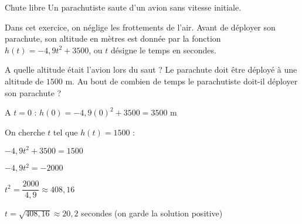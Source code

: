 \def\rdifficulty{2}
\begin{EXO}{Chute libre}{}
Un parachutiste saute d'un avion sans vitesse initiale.

Dans cet exercice, on néglige les frottements de l'air.
Avant de déployer son parachute, son altitude en mètres est donnée par la fonction $h(t)=-4,9t^2+3500$, ou $t$ désigne le temps en secondes.
\begin{tcbenumerate}[1]
\tcbitem {} A quelle altitude était l'avion lors du saut ?
\tcbitem {} Le parachute doit être déployé à une altitude de $1500$ m. Au bout de combien de temps le parachutiste doit-il déployer son parachute ?
\end{tcbenumerate}

\exocorrection

\begin{tcbenumerate}[1]
\tcbitem A $t=0$ : $h(0) = -4,9(0)^2 + 3500 = 3500$ m

\tcbitem On cherche $t$ tel que $h(t) = 1500$ :

$-4,9t^2 + 3500 = 1500$

$-4,9t^2 = -2000$

$t^2 = \dfrac{2000}{4,9} \approx 408,16$

$t = \sqrt{408,16} \approx 20,2$ secondes (on garde la solution positive)
\end{tcbenumerate}
\end{EXO}
\def\rdifficulty{3}
